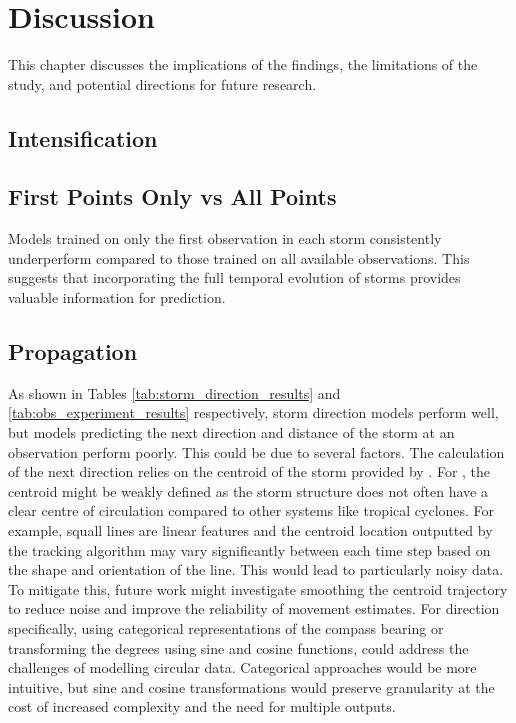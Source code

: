 \chapter{Discussion}
\label{ch:discuss}

This chapter discusses the implications of the findings, the limitations of the study, and potential directions for future research.

\section{Intensification}


\section{First Points Only vs All Points}

Models trained on only the first observation in each storm consistently underperform compared to those trained on all available observations. This suggests that incorporating the full temporal evolution of storms provides valuable information for prediction. 

\section{Propagation}

As shown in Tables \ref{tab:storm_direction_results} and \ref{tab:obs_experiment_results} respectively, storm direction models perform well, but models predicting the next direction and distance of the storm at an observation perform poorly. This could be due to several factors. The calculation of the next direction relies on the centroid of the storm provided by \cite{Hill2023}. For , the centroid might be weakly defined as the storm structure does not often have a clear centre of circulation compared to other systems like tropical cyclones. For example, squall lines are linear features and the centroid location outputted by the tracking algorithm may vary significantly between each time step based on the shape and orientation of the line. This would lead to particularly noisy data. To mitigate this, future work might investigate smoothing the centroid trajectory to reduce noise and improve the reliability of movement estimates. For direction specifically, using categorical representations of the compass bearing or transforming the degrees using sine and cosine functions, could address the challenges of modelling circular data. Categorical approaches would be more intuitive, but sine and cosine transformations would preserve granularity at the cost of increased complexity and the need for multiple outputs.

